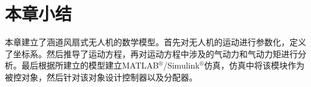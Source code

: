 \section{本章小结}
本章建立了涵道风扇式无人机的数学模型。首先对无人机的运动进行参数化，定义了坐标系。然后推导了运动方程，再对运动方程中涉及的气动力和气动力矩进行分析。最后根据所建立的模型建立MATLAB$^\circledR$/Simulink$^\circledR$仿真，仿真中将该模块作为被控对象，然后针对该对象设计控制器以及分配器。





%
